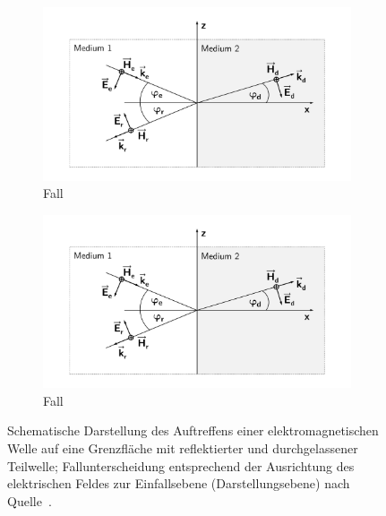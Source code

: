 \begin{figure}
    \centering
    \begin{subfigure}[c]{0.45\textwidth}
        \includegraphics[page = 1, width=\textwidth, trim = 3.5cm 1cm 3.5cm 1cm, clip]{Abbildungen/Kapitel2/Wellenreflektion.pdf}
        \caption{Fall \label{subfig:2_Wellenreflektion_Fall1}}
    \end{subfigure}
    \hspace{1cm}
    \begin{subfigure}[c]{0.45\textwidth}
        \includegraphics[page = 2, width=\textwidth, trim = 3.5cm 1cm 3.5cm 1cm, clip]{Abbildungen/Kapitel2/Wellenreflektion.pdf}
        \caption{Fall \label{subfig:2_Wellenreflektion_Fall2}}
    \end{subfigure}
    \caption[Schematische Darstellung des Auftreffens einer elektromagnetischen Welle auf eine Grenzfläche mit reflektierter und durchgelassener Teilwelle nach Quelle~\cite{EM_Schirmung}]{Schematische Darstellung des Auftreffens einer elektromagnetischen Welle auf eine Grenzfläche mit reflektierter und durchgelassener Teilwelle; Fallunterscheidung entsprechend der Ausrichtung des elektrischen Feldes zur Einfallsebene (Darstellungsebene) nach Quelle~\cite{EM_Schirmung}.}
    \label{fig:2_Wellenreflektion}
\end{figure}

